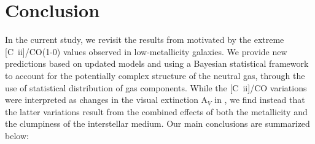 \documentclass{aa}
\newcommand{\cii}{[C~{\sc ii}]}
\begin{document}
\section{Conclusion}
\label{section_conclusion}
In the current study, we revisit the results from  motivated by the extreme \cii /CO(1-0) values observed in low-metallicity galaxies. We provide new predictions based on updated models and using a Bayesian statistical framework to account for the potentially complex structure of the neutral gas, through the use of statistical distribution of gas components. While the \cii/CO variations were interpreted as changes in the visual extinction A$_V$ in , we find instead that the latter variations result from the combined effects of both the metallicity and the clumpiness of the interstellar medium. Our main conclusions are summarized below:
\end{document}
